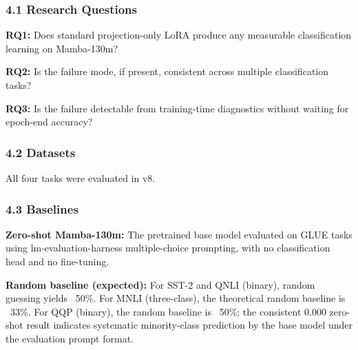 
\subsubsection{4.1 Research Questions}

\textbf{RQ1:} Does standard projection-only LoRA produce any measurable classification learning on Mamba-130m?

\textbf{RQ2:} Is the failure mode, if present, consistent across multiple classification tasks?

\textbf{RQ3:} Is the failure detectable from training-time diagnostics without waiting for epoch-end accuracy?

\subsubsection{4.2 Datasets}

\begin{table}[htbp]
\centering
{}
\end{table}

All four tasks were evaluated in v8.

\subsubsection{4.3 Baselines}

\textbf{Zero-shot Mamba-130m:} The pretrained base model evaluated on GLUE tasks using lm-evaluation-harness multiple-choice prompting, with no classification head and no fine-tuning.

\textbf{Random baseline (expected):} For SST-2 and QNLI (binary), random guessing yields ~50\%. For MNLI (three-class), the theoretical random baseline is ~33\%. For QQP (binary), the random baseline is ~50\%; the consistent 0.000 zero-shot result indicates systematic minority-class prediction by the base model under the evaluation prompt format.

